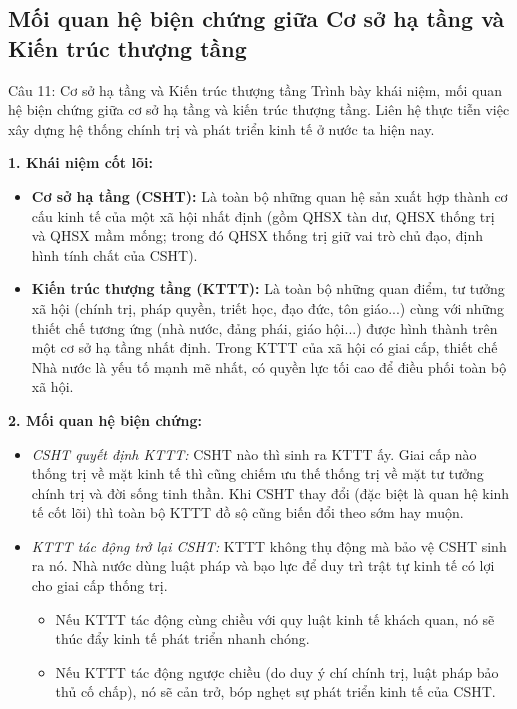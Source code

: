\documentclass[12pt,a4paper]{article}
\begin{document}
{\subsection{Mối quan hệ biện chứng giữa Cơ sở hạ tầng và Kiến trúc thượng tầng}

\begin{questionbox}{Câu 11: Cơ sở hạ tầng và Kiến trúc thượng tầng}
Trình bày khái niệm, mối quan hệ biện chứng giữa cơ sở hạ tầng và kiến trúc thượng tầng. Liên hệ thực tiễn việc xây dựng hệ thống chính trị và phát triển kinh tế ở nước ta hiện nay.
\end{questionbox}

\noindent
\textbf{1. Khái niệm cốt lõi:}
\begin{itemize}
    \item \textbf{Cơ sở hạ tầng (CSHT):} Là toàn bộ những quan hệ sản xuất hợp thành cơ cấu kinh tế của một xã hội nhất định (gồm QHSX tàn dư, QHSX thống trị và QHSX mầm mống; trong đó QHSX thống trị giữ vai trò chủ đạo, định hình tính chất của CSHT).
    \item \textbf{Kiến trúc thượng tầng (KTTT):} Là toàn bộ những quan điểm, tư tưởng xã hội (chính trị, pháp quyền, triết học, đạo đức, tôn giáo...) cùng với những thiết chế tương ứng (nhà nước, đảng phái, giáo hội...) được hình thành trên một cơ sở hạ tầng nhất định. Trong KTTT của xã hội có giai cấp, thiết chế Nhà nước là yếu tố mạnh mẽ nhất, có quyền lực tối cao để điều phối toàn bộ xã hội.
\end{itemize}

\noindent
\textbf{2. Mối quan hệ biện chứng:}
\begin{itemize}
    \item \textit{CSHT quyết định KTTT:} CSHT nào thì sinh ra KTTT ấy. Giai cấp nào thống trị về mặt kinh tế thì cũng chiếm ưu thế thống trị về mặt tư tưởng chính trị và đời sống tinh thần. Khi CSHT thay đổi (đặc biệt là quan hệ kinh tế cốt lõi) thì toàn bộ KTTT đồ sộ cũng biến đổi theo sớm hay muộn.
    \item \textit{KTTT tác động trở lại CSHT:} KTTT không thụ động mà bảo vệ CSHT sinh ra nó. Nhà nước dùng luật pháp và bạo lực để duy trì trật tự kinh tế có lợi cho giai cấp thống trị.
    \begin{itemize}
        \item Nếu KTTT tác động cùng chiều với quy luật kinh tế khách quan, nó sẽ thúc đẩy kinh tế phát triển nhanh chóng.
        \item Nếu KTTT tác động ngược chiều (do duy ý chí chính trị, luật pháp bảo thủ cố chấp), nó sẽ cản trở, bóp nghẹt sự phát triển kinh tế của CSHT.
    \end{itemize}
\end{itemize}

}
\end{document}
